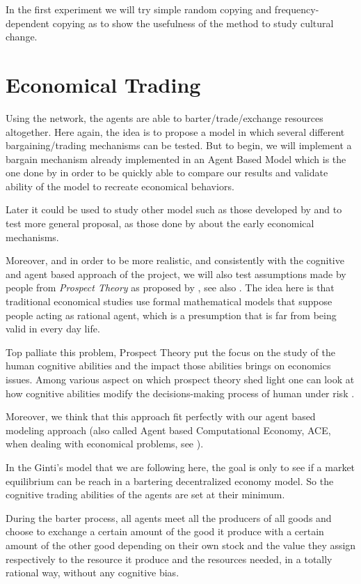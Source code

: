 \documentclass{wscpaperproc}
\begin{document}
In the first experiment we will try simple random copying and frequency-dependent copying as \cite{mesoudi_random_2009} to show the usefulness of the method to study cultural change. 


\section{Economical Trading}
\label{trade}

Using the network, the agents are able to barter/trade/exchange resources altogether. Here again, the idea is to propose a model in which several different bargaining/trading mechanisms can be tested. But to begin, we will implement a bargain mechanism already implemented in an Agent Based Model which is the one done by
\cite{gintis_emergence_2006} in order to be quickly able to compare our results and validate ability of the model to recreate economical behaviors. 

Later it could be used to study other model such as those developed by 
\cite{rubinstein_equilibrium_1985} and to test more general proposal, as those done by \cite{polanyi_trade_1957,polanyi_livelihood_1977} about the early economical mechanisms.

Moreover, and in order to be more realistic, and consistently with the cognitive and agent based approach of the project, we will also test assumptions made by people from \emph{Prospect Theory} as proposed by 
\cite{kahneman_prospect_1979}, see also
\cite{camerer_prospect_2004}. The idea here is that traditional economical studies use formal mathematical models that suppose people acting as rational agent, which is a presumption that is far from being valid  in every day life. 

Top palliate this problem, Prospect Theory put the focus on the study of the human cognitive abilities and the impact those abilities brings on economics issues. Among various aspect on which prospect theory shed light one can look at how cognitive abilities modify the decisions-making process of human under risk
\cite{weber_disposition_1998}.

Moreover, we think that this approach fit perfectly with our agent based modeling approach (also called Agent based Computational Economy, ACE, when dealing with economical problems, see
\cite{tesfatsion_introduction_2001}).

In the Ginti's model that we are following here, the goal is only to see if a market equilibrium can be reach in a bartering decentralized economy model. So the cognitive trading abilities of the agents are set at their minimum. 

During the barter process, all agents meet all the producers of all goods and choose to exchange a certain amount of the good it produce with a certain amount of the other good depending on their own stock and the value they assign respectively to the resource it produce and the resources needed, in a totally rational way, without any cognitive bias.


  
\end{document}

